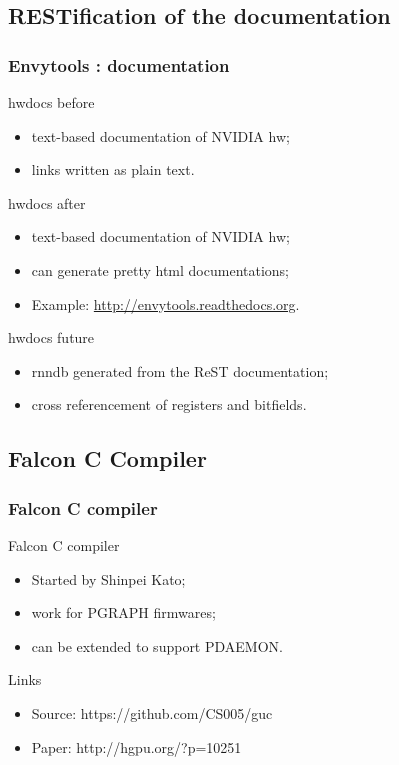 \documentclass[11pt,english,compress]{beamer}
\begin{document}
\subsection{RESTification of the documentation}
\begin{frame}
	\frametitle{Envytools : documentation}

	\begin{block}{hwdocs before}
		\begin{itemize}
			\item text-based documentation of NVIDIA hw;
			\item links written as plain text.
		\end{itemize}
	\end{block}

	\begin{block}{hwdocs after}
		\begin{itemize}
			\item text-based documentation of NVIDIA hw;
			\item can generate pretty html documentations;
			\item Example: \url{http://envytools.readthedocs.org}.
		\end{itemize}
	\end{block}

	\begin{block}{hwdocs future}
		\begin{itemize}
			\item rnndb generated from the ReST documentation;
			\item cross referencement of registers and bitfields.
		\end{itemize}
	\end{block}
\end{frame}

\subsection{Falcon C Compiler}
\begin{frame}
	\frametitle{Falcon C compiler}

	\begin{block}{Falcon C compiler}
		\begin{itemize}
			\item Started by Shinpei Kato;
			\item work for PGRAPH firmwares;
			\item can be extended to support PDAEMON.
		\end{itemize}
	\end{block}

	\begin{block}{Links}
		\begin{itemize}
			\item Source: https://github.com/CS005/guc
			\item Paper: http://hgpu.org/?p=10251
		\end{itemize}
	\end{block}
\end{frame}
\end{document}

